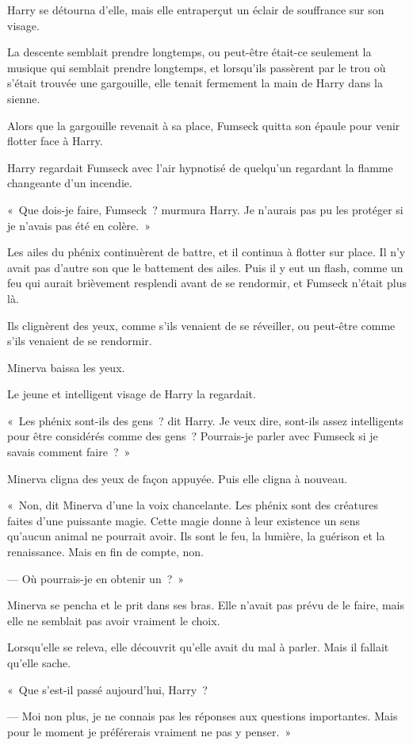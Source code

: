 Harry se détourna d'elle, mais elle entraperçut un éclair de souffrance sur son visage.

La descente semblait prendre longtemps, ou peut-être était-ce seulement la musique qui semblait prendre longtemps, et lorsqu'ils passèrent par le trou où s'était trouvée une gargouille, elle tenait fermement la main de Harry dans la sienne.

Alors que la gargouille revenait à sa place, Fumseck quitta son épaule pour venir flotter face à Harry.

Harry regardait Fumseck avec l'air hypnotisé de quelqu'un regardant la flamme changeante d'un incendie.

«~Que dois-je faire, Fumseck~? murmura Harry. Je n'aurais pas pu les protéger si je n'avais pas été en colère.~»

Les ailes du phénix continuèrent de battre, et il continua à flotter sur place. Il n'y avait pas d'autre son que le battement des ailes. Puis il y eut un flash, comme un feu qui aurait brièvement resplendi avant de se rendormir, et Fumseck n'était plus là.

Ils clignèrent des yeux, comme s'ils venaient de se réveiller, ou peut-être comme s'ils venaient de se rendormir.

Minerva baissa les yeux.

Le jeune et intelligent visage de Harry la regardait.

«~Les phénix sont-ils des gens~? dit Harry. Je veux dire, sont-ils assez intelligents pour être considérés comme des gens~? Pourrais-je parler avec Fumseck si je savais comment faire~?~»

Minerva cligna des yeux de façon appuyée. Puis elle cligna à nouveau.

«~Non, dit Minerva d'une la voix chancelante. Les phénix sont des créatures faites d'une puissante magie. Cette magie donne à leur existence un sens qu'aucun animal ne pourrait avoir. Ils sont le feu, la lumière, la guérison et la renaissance. Mais en fin de compte, non.

--- Où pourrais-je en obtenir un~?~»

Minerva se pencha et le prit dans ses bras. Elle n'avait pas prévu de le faire, mais elle ne semblait pas avoir vraiment le choix.

Lorsqu'elle se releva, elle découvrit qu'elle avait du mal à parler. Mais il fallait qu'elle sache.

«~Que s'est-il passé aujourd'hui, Harry~?

--- Moi non plus, je ne connais pas les réponses aux questions importantes. Mais pour le moment je préférerais vraiment ne pas y penser.~»

